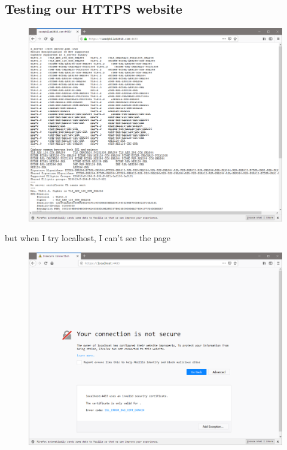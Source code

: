 \documentclass{article}
\begin{document}
\subsection{Testing our HTTPS website}
\begin{figure}[H]\centering\includegraphics[width=\textwidth]{3-5.png}\end{figure}
but when I try localhost, I can't see the page
\begin{figure}[H]\centering\includegraphics[width=\textwidth]{3-6.png}\end{figure}
\end{document}
